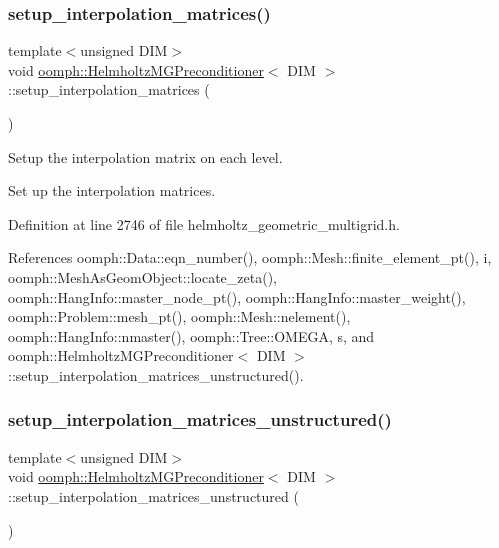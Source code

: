 \subsubsection{\texorpdfstring{setup\+\_\+interpolation\+\_\+matrices()}{setup\_interpolation\_matrices()}}
{\footnotesize\ttfamily template$<$unsigned D\+IM$>$ \\
void \hyperlink{classoomph_1_1HelmholtzMGPreconditioner}{oomph\+::\+Helmholtz\+M\+G\+Preconditioner}$<$ D\+IM $>$\+::setup\+\_\+interpolation\+\_\+matrices (\begin{DoxyParamCaption}{ }\end{DoxyParamCaption})}



Setup the interpolation matrix on each level. 

Set up the interpolation matrices. 

Definition at line 2746 of file helmholtz\+\_\+geometric\+\_\+multigrid.\+h.



References oomph\+::\+Data\+::eqn\+\_\+number(), oomph\+::\+Mesh\+::finite\+\_\+element\+\_\+pt(), i, oomph\+::\+Mesh\+As\+Geom\+Object\+::locate\+\_\+zeta(), oomph\+::\+Hang\+Info\+::master\+\_\+node\+\_\+pt(), oomph\+::\+Hang\+Info\+::master\+\_\+weight(), oomph\+::\+Problem\+::mesh\+\_\+pt(), oomph\+::\+Mesh\+::nelement(), oomph\+::\+Hang\+Info\+::nmaster(), oomph\+::\+Tree\+::\+O\+M\+E\+GA, s, and oomph\+::\+Helmholtz\+M\+G\+Preconditioner$<$ D\+I\+M $>$\+::setup\+\_\+interpolation\+\_\+matrices\+\_\+unstructured().

\mbox{\label{classoomph_1_1HelmholtzMGPreconditioner_ac392a7156bbf904f7c5ec1c4ed3d4b96}} 
\subsubsection{\texorpdfstring{setup\+\_\+interpolation\+\_\+matrices\+\_\+unstructured()}{setup\_interpolation\_matrices\_unstructured()}}
{\footnotesize\ttfamily template$<$unsigned D\+IM$>$ \\
void \hyperlink{classoomph_1_1HelmholtzMGPreconditioner}{oomph\+::\+Helmholtz\+M\+G\+Preconditioner}$<$ D\+IM $>$\+::setup\+\_\+interpolation\+\_\+matrices\+\_\+unstructured (\begin{DoxyParamCaption}{ }\end{DoxyParamCaption})}



